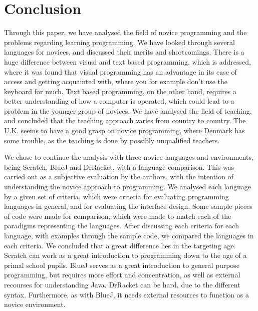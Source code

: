 \chapter{Conclusion}
\label{chap:conclusion}

Through this paper, we have analysed the field of novice programming and the problems regarding learning programming. We have looked through several languages for novices, and discussed their merits and shortcomings. There is a huge difference between visual and text based programming, which is addressed, where it was found that visual programming has an advantage in its ease of access and getting acquainted with, where you for example don't use the keyboard for much. Text based programming, on the other hand, requires a better understanding of how a computer is operated, which could lead to a problem in the younger group of novices. We have analysed the field of teaching, and concluded that the teaching approach varies from country to country. The U.K. seems to have a good grasp on novice programming, where Denmark has some trouble, as the teaching is done by possibly unqualified teachers.

We chose to continue the analysis with three novice languages and environments, being Scratch, BlueJ and DrRacket, with a language comparison. This was carried out as a subjective evaluation by the authors, with the intention of understanding the novice approach to programming. We analysed each language by a given set of criteria, which were criteria for evaluating programming languages in general, and for evaluating the interface design. Some sample pieces of code were made for comparison, which were made to match each of the paradigms representing the languages. After discussing each criteria for each language, with examples through the sample code, we compared the languages in each criteria. We concluded that a great difference lies in the targeting age. Scratch can work as a great introduction to programming down to the age of a primal school pupils. BlueJ serves as a great introduction to general purpose programming, but requires more effort and concentration, as well as external recourses for understanding Java. DrRacket can be hard, due to the different syntax. Furthermore, as with BlueJ, it needs external resources to function as a novice environment.



